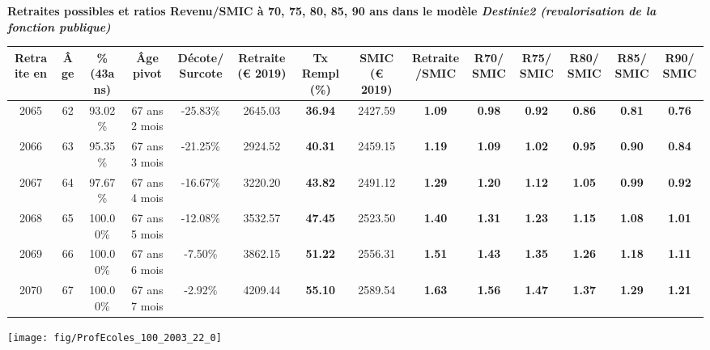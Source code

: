  \vspace{0.1cm} 
{\bf \noindent Retraites possibles et ratios Revenu/SMIC à 70, 75, 80, 85, 90 ans dans le modèle \emph{Destinie2 (revalorisation de la fonction publique)}}  
 
\begin{adjustbox}{max width=\textwidth} 
\begin{tabular}[htb]{|c|c||c|c|c||c|c||c|c||c|c|c|c|c|} 
\hline 
 Retraite en &  Âge &  \%(43ans) &  Âge pivot &  Décote/Surcote &  Retraite (\euro{} 2019) &  Tx Rempl(\%) &  SMIC (\euro{} 2019) &  Retraite/SMIC &  R70/SMIC &  R75/SMIC &  R80/SMIC &  R85/SMIC &  R90/SMIC \\ 
\hline \hline 
 2065 &  62 &  93.02\% &  67 ans 2 mois &  -25.83\% &  2645.03 &  {\bf 36.94} &  2427.59 &  {\bf 1.09} &  {\bf {\color{red} 0.98}} &  {\bf {\color{red} 0.92}} &  {\bf {\color{red} 0.86}} &  {\bf {\color{red} 0.81}} &  {\bf {\color{red} 0.76}} \\ 
\hline 
 2066 &  63 &  95.35\% &  67 ans 3 mois &  -21.25\% &  2924.52 &  {\bf 40.31} &  2459.15 &  {\bf 1.19} &  {\bf 1.09} &  {\bf 1.02} &  {\bf {\color{red} 0.95}} &  {\bf {\color{red} 0.90}} &  {\bf {\color{red} 0.84}} \\ 
\hline 
 2067 &  64 &  97.67\% &  67 ans 4 mois &  -16.67\% &  3220.20 &  {\bf 43.82} &  2491.12 &  {\bf 1.29} &  {\bf 1.20} &  {\bf 1.12} &  {\bf 1.05} &  {\bf {\color{red} 0.99}} &  {\bf {\color{red} 0.92}} \\ 
\hline 
 2068 &  65 &  100.00\% &  67 ans 5 mois &  -12.08\% &  3532.57 &  {\bf 47.45} &  2523.50 &  {\bf 1.40} &  {\bf 1.31} &  {\bf 1.23} &  {\bf 1.15} &  {\bf 1.08} &  {\bf 1.01} \\ 
\hline 
 2069 &  66 &  100.00\% &  67 ans 6 mois &  -7.50\% &  3862.15 &  {\bf 51.22} &  2556.31 &  {\bf 1.51} &  {\bf 1.43} &  {\bf 1.35} &  {\bf 1.26} &  {\bf 1.18} &  {\bf 1.11} \\ 
\hline 
 2070 &  67 &  100.00\% &  67 ans 7 mois &  -2.92\% &  4209.44 &  {\bf 55.10} &  2589.54 &  {\bf 1.63} &  {\bf 1.56} &  {\bf 1.47} &  {\bf 1.37} &  {\bf 1.29} &  {\bf 1.21} \\ 
\hline 
\hline 
\end{tabular} 
\end{adjustbox} 
 
 \vspace{0.1cm} 

 {\hspace{-2.2cm}\texttt{[image: fig/ProfEcoles\_100\_2003\_22\_0]}} 

